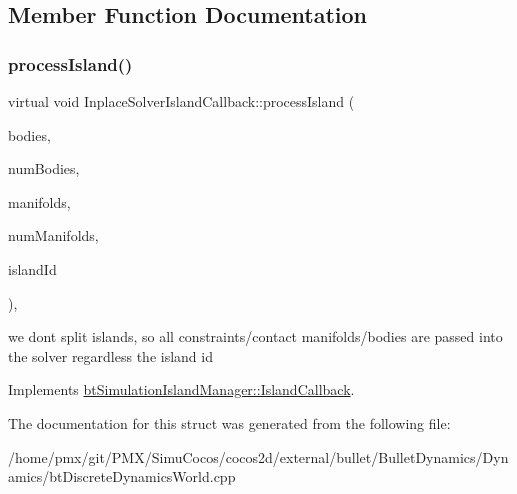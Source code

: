 \subsection{Member Function Documentation}
\mbox{\label{structInplaceSolverIslandCallback_a9f9b7859f93b6c14c83cbe8ca11a02f8}} 
\subsubsection{\texorpdfstring{process\+Island()}{processIsland()}}
{\footnotesize\ttfamily virtual void Inplace\+Solver\+Island\+Callback\+::process\+Island (\begin{DoxyParamCaption}\item[{bt\+Collision\+Object $\ast$$\ast$}]{bodies,  }\item[{int}]{num\+Bodies,  }\item[{bt\+Persistent\+Manifold $\ast$$\ast$}]{manifolds,  }\item[{int}]{num\+Manifolds,  }\item[{int}]{island\+Id }\end{DoxyParamCaption})\hspace{0.3cm}{\ttfamily [inline]}, {\ttfamily [virtual]}}

we don\textquotesingle{}t split islands, so all constraints/contact manifolds/bodies are passed into the solver regardless the island id 

Implements \hyperlink{structbtSimulationIslandManager_1_1IslandCallback}{bt\+Simulation\+Island\+Manager\+::\+Island\+Callback}.



The documentation for this struct was generated from the following file\+:\begin{DoxyCompactItemize}
\item 
/home/pmx/git/\+P\+M\+X/\+Simu\+Cocos/cocos2d/external/bullet/\+Bullet\+Dynamics/\+Dynamics/bt\+Discrete\+Dynamics\+World.\+cpp\end{DoxyCompactItemize}
